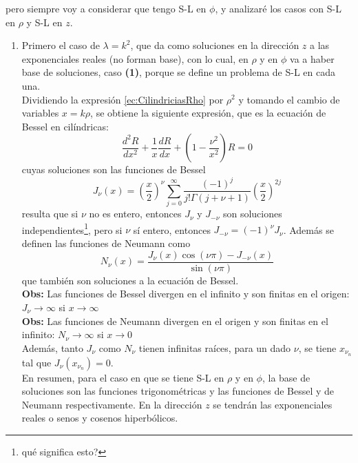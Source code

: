 pero siempre voy a considerar que tengo S-L en $\phi$, y analizaré los casos con S-L en $\rho$ y S-L en $z$.
\begin{enumerate}
    \item Primero el caso de $\lambda = k^{2}$, que da como soluciones en la dirección $z$ a las exponenciales reales (no forman base), con lo cual, en $\rho$ y en $\phi$ va a haber base de soluciones, caso \textbf{(1)}, porque se define un problema de S-L en cada una.\\
    \indent Dividiendo la expresión \eqref{ec:CilindriciasRho} por $\rho^{2}$ y tomando el cambio de variables $x = k\rho$, se obtiene la siguiente expresión, que es la ecuación de Bessel en cilíndricas:
    \begin{equation*}
        \frac{d^{2}R}{dx^{2}} + \frac{1}{x}\frac{dR}{dx} + 
        \left(
            1 - \frac{\nu^{2}}{x^{2}}
        \right)R = 0
    \end{equation*}
    cuyas soluciones son las funciones de Bessel
    \begin{equation*}
        J_{\nu}(x) = 
        \left(
            \frac{x}{2}
        \right)^{\nu}
        \sum\limits_{j = 0}^{\infty}
        \frac{(-1)^{j}}{j!\Gamma(j+ \nu + 1)}
        \left(
            \frac{x}{2}
        \right)^{2j}
    \end{equation*}
    resulta que si $\nu$ no es entero, entonces $J_{\nu}$ y $J_{-\nu}$ son soluciones independientes\footnote{qué significa esto?}, pero si $\nu$ sí entero, entonces $J_{-\nu} = (-1)^{\nu}J_{\nu}$. Además se definen las funciones de Neumann como
    \begin{equation*}
        N_{\nu}(x) = 
        \frac{J_{\nu}(x)\cos{(\nu\pi)}-J_{-\nu}(x)}{\sin{(\nu\pi)}}
    \end{equation*}
    que también son soluciones a la ecuación de Bessel.\\
    \textbf{Obs:} Las funciones de Bessel divergen en el infinito y son finitas en el origen: $J_{\nu}\to\infty$ si $x \to \infty$\\
    \textbf{Obs:} Las funciones de Neumann divergen en el origen y son finitas en el infinito: $N_{\nu}\to \infty$ si $x \to 0$\\
    \indent Además, tanto $J_{\nu}$ como $N_{\nu}$ tienen infinitas raíces, para un dado $\nu$, se tiene $x_{\nu_{n}}$ tal que $J_{\nu}(x_{\nu_{n}}) = 0$.\\
    \indent En resumen, para el caso en que se tiene S-L en $\rho$ y en $\phi$, la base de soluciones son las funciones trigonométricas y las funciones de Bessel y de Neumann respectivamente. En la dirección $z$ se tendrán las exponenciales reales o senos y cosenos hiperbólicos.

\end{enumerate}
